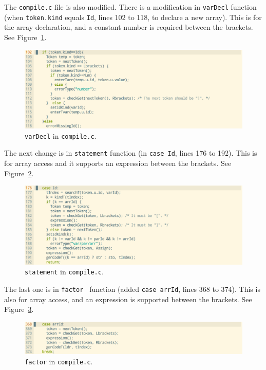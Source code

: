 \documentclass{article}
\begin{document}
The {\tt compile.c} file is also modified. There is a modification in {\tt varDecl} function (when {\tt token.kind} equals {\tt Id}, lines 102 to 118, to declare a new array). This is for the array declaration, and a constant number is required between the brackets. See Figure~\ref{fig:q435}.\\

\begin{figure}[h]
  \includegraphics[scale=0.35]{./img/Q4-3-5.png}
  \centering
  \caption{{\tt varDecl} in {\tt compile.c}.}
  \label{fig:q435}
\end{figure}

The next change is in {\tt statement} function (in {\tt case Id}, lines 176 to 192). This is for array access and it supports an expression between the brackets. See Figure~\ref{fig:q436}.\\

\begin{figure}[h]
  \includegraphics[scale=0.35]{./img/Q4-3-6.png}
  \centering
  \caption{{\tt statement} in {\tt compile.c}.}
  \label{fig:q436}
\end{figure}

The last one is in {\tt factor } function (added {\tt case arrId}, lines 368 to 374). This is also for array access, and an expression is supported between the brackets. See Figure~\ref{fig:q437}.\\

\begin{figure}[h]
  \includegraphics[scale=0.35]{./img/Q4-3-7.png}
  \centering
  \caption{{\tt factor} in {\tt compile.c}.}
  \label{fig:q437}
\end{figure}
\clearpage
\fi
\end{document}
